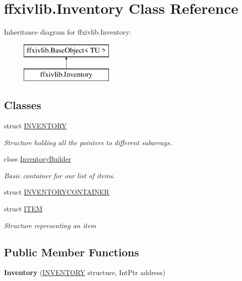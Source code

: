 \hypertarget{classffxivlib_1_1_inventory}{\section{ffxivlib.\-Inventory Class Reference}
\label{classffxivlib_1_1_inventory}
}
Inheritance diagram for ffxivlib.\-Inventory\-:\begin{figure}[H]
\begin{center}
\leavevmode
\includegraphics[height=2.000000cm]{classffxivlib_1_1_inventory}
\end{center}
\end{figure}
\subsection*{Classes}
\begin{DoxyCompactItemize}
\item 
struct \hyperlink{structffxivlib_1_1_inventory_1_1_i_n_v_e_n_t_o_r_y}{I\-N\-V\-E\-N\-T\-O\-R\-Y}
\begin{DoxyCompactList}\small\item\em Structure holding all the pointers to different subarrays. \end{DoxyCompactList}\item 
class \hyperlink{classffxivlib_1_1_inventory_1_1_inventory_builder}{Inventory\-Builder}
\begin{DoxyCompactList}\small\item\em Basic container for our list of items. \end{DoxyCompactList}\item 
struct \hyperlink{structffxivlib_1_1_inventory_1_1_i_n_v_e_n_t_o_r_y_c_o_n_t_a_i_n_e_r}{I\-N\-V\-E\-N\-T\-O\-R\-Y\-C\-O\-N\-T\-A\-I\-N\-E\-R}
\item 
struct \hyperlink{structffxivlib_1_1_inventory_1_1_i_t_e_m}{I\-T\-E\-M}
\begin{DoxyCompactList}\small\item\em Structure representing an item \end{DoxyCompactList}\end{DoxyCompactItemize}
\subsection*{Public Member Functions}
\begin{DoxyCompactItemize}
\item 
\hypertarget{classffxivlib_1_1_inventory_a15fea4c3d2b42bf899c5def99b69880a}{{\bfseries Inventory} (\hyperlink{structffxivlib_1_1_inventory_1_1_i_n_v_e_n_t_o_r_y}{I\-N\-V\-E\-N\-T\-O\-R\-Y} structure, Int\-Ptr address)}\label{classffxivlib_1_1_inventory_a15fea4c3d2b42bf899c5def99b69880a}

\end{DoxyCompactItemize}
